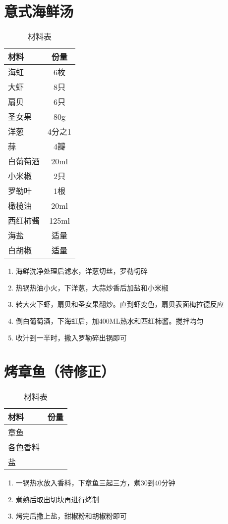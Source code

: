\section{意式海鲜汤}

\begin{table}[H]
    \centering
    \begin{tabular}{|l||c|}\hline
     \textbf{材料}    &  \textbf{份量}\\ \hline\hline
    海虹 & 6枚 \\ \hline
    大虾  &  8只 \\ \hline
    扇贝  &  6只\\ \hline
    圣女果  & 80g \\ \hline
    洋葱  &  4分之1\\ \hline
    蒜  & 4瓣 \\ \hline
    白葡萄酒 & 20ml \\ \hline
    小米椒 & 2只 \\ \hline
    罗勒叶  & 1根 \\ \hline
    橄榄油  & 20ml \\ \hline
    西红柿酱  & 125ml \\ \hline
    海盐  & 适量 \\ \hline
    白胡椒  & 适量 \\ \hline
    \end{tabular}
    \caption{材料表}
\end{table}

\begin{enumerate}
    \item 海鲜洗净处理后滤水，洋葱切丝，罗勒切碎
    \item 热锅热油小火，下洋葱，大蒜炒香后加盐和小米椒
    \item 转大火下虾，扇贝和圣女果翻炒。直到虾变色，扇贝表面梅拉德反应
    \item 倒白葡萄酒，下海虹后，加400ML热水和西红柿酱。搅拌均匀
    \item 收汁到一半时，撒入罗勒碎出锅即可
\end{enumerate}




\section{烤章鱼（待修正）}

\begin{table}[H]
    \centering
    \begin{tabular}{|l||c|}\hline
     \textbf{材料}    &  \textbf{份量}\\ \hline\hline
    章鱼 &  \\ \hline
    各色香料  &   \\ \hline
    盐   &   \\ \hline

    \end{tabular}
    \caption{材料表}
\end{table}

\begin{enumerate}
    \item 一锅热水放入香料，下章鱼三起三方，煮30到40分钟
    \item 煮熟后取出切块再进行烤制
    \item 烤完后撒上盐，甜椒粉和胡椒粉即可
\end{enumerate}